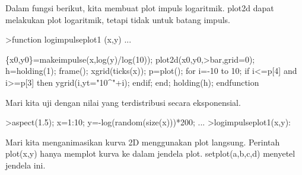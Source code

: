 \documentclass[a4paper,10pt]{article}
\begin{document}
\begin{eulernotebook}
\begin{eulercomment}
\begin{eulercomment}
\begin{eulercomment}
\begin{eulercomment}
\begin{eulercomment}
\begin{eulercomment}
\begin{eulercomment}
Dalam fungsi berikut, kita membuat plot impuls logaritmik. plot2d
dapat melakukan plot logaritmik, tetapi tidak untuk batang impuls.
\end{eulercomment}
\begin{eulerprompt}
>function logimpulseplot1 (x,y) ...
\end{eulerprompt}
\begin{eulerudf}
    \{x0,y0\}=makeimpulse(x,log(y)/log(10));
    plot2d(x0,y0,>bar,grid=0);
    h=holding(1);
    frame();
    xgrid(ticks(x));
    p=plot();
    for i=-10 to 10;
      if i<=p[4] and i>=p[3] then
         ygrid(i,yt="10^"+i);
      endif;
    end;
    holding(h);
  endfunction
\end{eulerudf}
\begin{eulercomment}
Mari kita uji dengan nilai yang terdistribusi secara eksponensial.
\end{eulercomment}
\begin{eulerprompt}
>aspect(1.5); x=1:10; y=-log(random(size(x)))*200; ...
>logimpulseplot1(x,y):
\end{eulerprompt}
\begin{eulercomment}
Mari kita menganimasikan kurva 2D menggunakan plot langsung. Perintah
plot(x,y) hanya memplot kurva ke dalam jendela plot. setplot(a,b,c,d)
menyetel jendela ini.


\end{eulercomment}
\end{eulercomment}
\end{eulercomment}
\end{eulercomment}
\end{eulercomment}
\end{eulercomment}
\end{eulercomment}
\end{eulernotebook}
\end{document}
